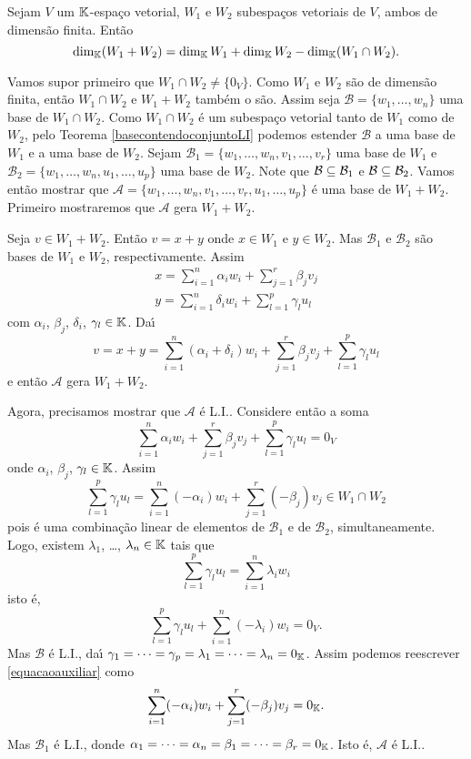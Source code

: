 \begin{proposicao}
	Sejam $V$ um $\mathbb{K}$-espa\c{c}o vetorial, $W_1$ e $W_2$ subespa\c{c}os vetoriais de $V$, ambos de dimens\~ao finita. Ent\~ao
	\[
		\dim_{\mathbb{K}}(W_1 + W_2) = \dim_{\mathbb{K}}W_1 + \dim_{\mathbb{K}}W_2 - \dim_{\mathbb{K}}(W_1 \cap W_2).
	\]
\end{proposicao}
\begin{prova}
	Vamos supor primeiro que $W_1 \cap W_2 \ne \{0_V\}$. Como $W_1$ e $W_2$ s\~ao de dimens\~ao finita, ent\~ao $W_1 \cap W_2$ e $W_1 + W_2$ tamb\'em o s\~ao. Assim seja $\mathcal{B} = \{w_1, \dots,w_n\}$ uma base de $W_1 \cap W_2$. Como $W_1 \cap W_2$ \'e um subespa\c{c}o vetorial tanto de $W_1$ como de $W_2$, pelo Teorema \ref{basecontendoconjuntoLI} podemos estender $\mathcal{B}$ a uma base de $W_1$ e a uma base de $W_2$. Sejam $\mathcal{B}_1 = \{w_1,\dots,w_n,v_1,\dots,v_r\}$ uma base de $W_1$ e $\mathcal{B}_2 = \{w_1,\dots,w_n,u_1,\dots,u_p\}$ uma base de $W_2$. Note que $\mathcal{B} \subseteq \mathcal{B}_1$ e $\mathcal{B} \subseteq \mathcal{B}_2$. Vamos ent\~ao mostrar que $\mathcal{A} = \{w_1,\dots,w_n,v_1,\dots,v_r,u_1,\dots,u_p\}$ \'e uma base de $W_1 + W_2$. Primeiro mostraremos que $\mathcal{A}$ gera $W_1 + W_2$.

	Seja $v \in W_1 + W_2$. Ent\~ao $v = x + y$ onde $x \in W_1$ e $y \in W_2$. Mas $\mathcal{B}_1$ e $\mathcal{B}_2$ s\~ao bases de $W_1$ e $W_2$, respectivamente. Assim
	\begin{align*}
		x = \sum_{i = 1}^n \alpha_i w_i + \sum_{j = 1}^r\beta_j v_j\\
		y = \sum_{i = 1}^n \delta_i w_i + \sum_{l = 1}^p\gamma_l u_l
	\end{align*}
	com $\alpha_i$, $\beta_j$, $\delta_i$, $\gamma_l \in \mathbb{K}$. Da{\'\i}
	\[
		v = x + y = \sum_{i = 1}^n(\alpha_i + \delta_i)w_i + \sum_{j = 1}^r\beta_jv_j + \sum_{l = 1}^p\gamma_lu_l
	\]
	e ent\~ao $\mathcal{A}$ gera $W_1 + W_2$.

	Agora, precisamos mostrar que $\mathcal{A}$ \'e L.I.. Considere ent\~ao a soma
	\[
		\sum_{i = 1}^n\alpha_iw_i + \sum_{j = 1}^r\beta_jv_j + \sum_{l = 1}^p\gamma_lu_l = 0_V
	\]
	onde $\alpha_i$, $\beta_j$, $\gamma_l \in \mathbb{K}$. Assim
	\begin{equation}\label{equacaoauxiliar}
		\sum_{l = 1}^p\gamma_lu_l = \sum_{i = 1}^n(-\alpha_i)w_i + \sum_{j = 1}^r(-\beta_j)v_j \in W_1 \cap W_2
	\end{equation}
	pois \'e uma combina\c{c}\~ao linear de elementos de $\mathcal{B}_1$ e de $\mathcal{B}_2$, simultaneamente. Logo, existem $\lambda_1$, \dots, $\lambda_n \in \mathbb{K}$ tais que
	\[
		\sum_{l = 1}^p\gamma_lu_l = \sum_{i = 1}^n\lambda_iw_i
	\]
	isto \'e,
	\[
		\sum_{l = 1}^p\gamma_lu_l + \sum_{i = 1}^n(-\lambda_i)w_i = 0_V.
	\]
	Mas $\mathcal{B}$ \'e L.I., da{\'\i} $\gamma_1 = \cdots = \gamma_p = \lambda_1 = \cdots = \lambda_n = 0_{\mathbb{K}}$. Assim podemos reescrever \eqref{equacaoauxiliar} como
	\[
		\sum_{i = 1}^n(-\alpha_i)w_i + \sum_{j = 1}^r(-\beta_j)v_j = 0_{\mathbb{K}}.
	\]
	Mas $\mathcal{B}_1$ \'e L.I., donde $\alpha_1 = \cdots = \alpha_n = \beta_1 = \cdots = \beta_r = 0_{\mathbb{K}}$. Isto \'e, $\mathcal{A}$ \'e L.I..


\end{prova}
